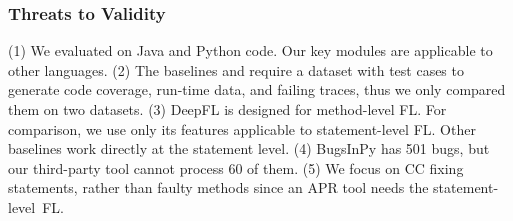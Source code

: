 \subsubsection{Threats to Validity}
(1) We evaluated {\tool} on Java and Python code. Our key modules are
applicable to other languages. (2) The baselines and {\tool}
require a dataset with test cases to generate code coverage,
run-time data, and failing traces, thus we only compared them on two
datasets.
(3) DeepFL is designed for method-level FL. For comparison, we use
only its features applicable to statement-level FL.
Other baselines work directly at the statement level.
(4) BugsInPy has 501 bugs, but our third-party tool cannot process 60
of them. (5) We focus on CC fixing statements, rather than faulty
methods since an APR tool needs the statement-level~FL.



